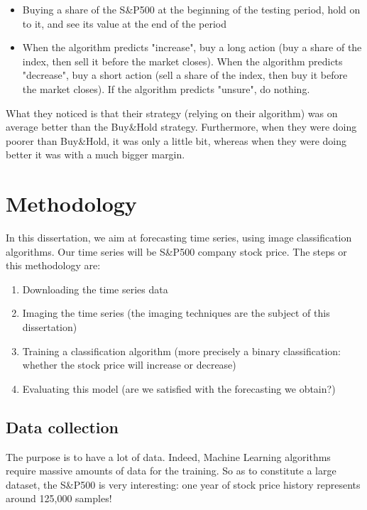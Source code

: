 \documentclass[11pt]{article}
\begin{document}
\begin{onehalfspace}
\begin{itemize}
    \item Buying a share of the S\&P500 at the beginning of the testing period, hold on to it, and see its value at the end of the period
    \item When the algorithm predicts "increase", buy a long action (buy a share of the index, then sell it before the market closes). When the algorithm predicts "decrease", buy a short action (sell a share of the index, then buy it before the market closes). If the algorithm predicts "unsure", do nothing. 
\end{itemize}

What they noticed is that their strategy (relying on their algorithm) was on average better than the Buy\&Hold strategy. Furthermore, when they were doing poorer than Buy\&Hold, it was only a little bit, whereas when they were doing better it was with a much bigger margin. 

\pagebreak

\section{Methodology}
\label{methodo}

In this dissertation, we aim at forecasting time series, using image classification algorithms. Our time series will be S\&P500 company stock price. The steps or this methodology are:

\begin{enumerate}
    \item Downloading the time series data
    \item Imaging the time series (the imaging techniques are the subject of this dissertation)
    \item Training a classification algorithm (more precisely a binary classification: whether the stock price will increase or decrease)
    \item Evaluating this model (are we satisfied with the forecasting we obtain?)
\end{enumerate}

\subsection{Data collection}

The purpose is to have a lot of data. Indeed, Machine Learning algorithms require massive amounts of data for the training. So as to constitute a large dataset, the S\&P500 is very interesting: one year of stock price history represents around 125,000 samples!


\end{onehalfspace}
\end{document}
